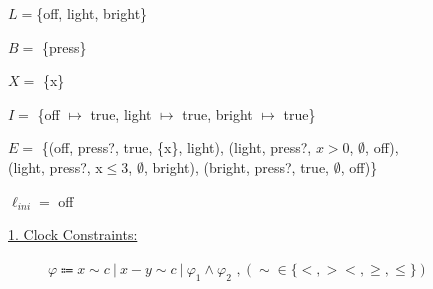 \begin{tcolorbox}[colback=kapiteleins!5!white, colframe=orange!75!black, title=\textbf{Timed Automaton $\mathcal{A} = (L, B, X, I, E, \ell_{ini})$ \hfill Edges $E=$ ($\ell$, $\alpha$, $\varphi$, $Y$, $\ell'$)}, left=0mm, right=0mm, top=0mm, bottom=0mm]
\begin{description}[leftmargin=2.25cm, labelwidth=1.5cm]
\item [Locations:] $L =$\{off, light, bright\}
\item[Alphabet:] $B =$ \{press\}
\item[Clocks:] $X =$ \{x\}
\item[Invariants:] $I =$ \{off $\mapsto$ true, light $\mapsto$ true, bright $\mapsto$ true\}
\item[Edges:] $E =$ \{(off, press?, true, \{x\}, light), (light, press?, $x>0$, $\emptyset$, off),\\(light, press?, x$\leq$3, $\emptyset$, bright), (bright, press?, true, $\emptyset$, off)\}
\item[Inital location:] $\ell_{ini} = $ off
\end{description}

\begin{description}
\item[\uline{1. Clock Constraints:}] $\varphi \Coloneqq x \sim c~|~x - y \sim c~|~\varphi_1 \land \varphi_2$ $, (\sim \in \{<,><,\ge,\le\})$


\end{description}
\end{tcolorbox}
